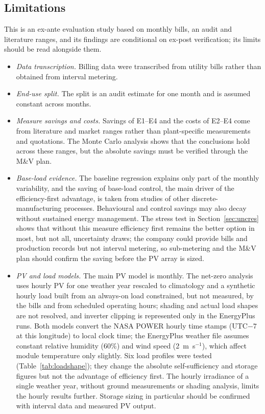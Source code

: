 \documentclass[preprint,12pt,authoryear]{elsarticle}
\begin{document}
\subsection{Limitations}
This is an ex-ante evaluation study based on monthly bills, an audit and literature ranges, and its findings are conditional on ex-post verification; its limits should be read alongside them.
\begin{itemize}
\item \emph{Data transcription.} Billing data were transcribed from utility bills rather than obtained from interval metering.
\item \emph{End-use split.} The split is an audit estimate for one month and is assumed constant across months.
\item \emph{Measure savings and costs.} Savings of E1--E4 and the costs of E2--E4 come from literature and market ranges rather than plant-specific measurements and quotations. The Monte Carlo analysis shows that the conclusions hold across these ranges, but the absolute savings must be verified through the M\&V plan.
\item \emph{Base-load evidence.} The baseline regression explains only part of the monthly variability, and the saving of base-load control, the main driver of the efficiency-first advantage, is taken from studies of other discrete-manufacturing processes. Behavioural and control savings may also decay without sustained energy management. The stress test in Section~\ref{sec:uncres} shows that without this measure efficiency first remains the better option in most, but not all, uncertainty draws; the company could provide bills and production records but not interval metering, so sub-metering and the M\&V plan should confirm the saving before the PV array is sized.
\item \emph{PV and load models.} The main PV model is monthly. The net-zero analysis uses hourly PV for one weather year rescaled to climatology and a synthetic hourly load built from an always-on load constrained, but not measured, by the bills and from scheduled operating hours; shading and actual load shapes are not resolved, and inverter clipping is represented only in the EnergyPlus runs. Both models convert the NASA POWER hourly time stamps (UTC$-7$ at this longitude) to local clock time; the EnergyPlus weather file assumes constant relative humidity (60\%) and wind speed (2~m~s$^{-1}$), which affect module temperature only slightly. Six load profiles were tested (Table~\ref{tab:loadshape}); they change the absolute self-sufficiency and storage figures but not the advantage of efficiency first. The hourly irradiance of a single weather year, without ground measurements or shading analysis, limits the hourly results further. Storage sizing in particular should be confirmed with interval data and measured PV output.

\end{itemize}
\end{document}
